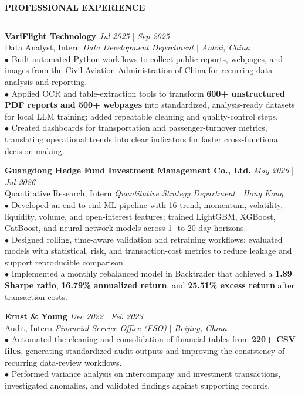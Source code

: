 \documentclass{../../../original_CV/resume}
\renewcommand{\sectionskip}{\vspace{0.10cm}}
\renewcommand{\sectionlineskip}{\vspace{0.10cm}}
\renewenvironment{rSection}[1]{
\sectionskip
\textcolor{UC San Diego Blue}{\textbf{\large\bfseries\MakeUppercase{#1}}}
\sectionlineskip
\hrule
\begin{list}{}{
\setlength{\leftmargin}{0em}
}
\item[]
}{
\end{list}
}
\begin{document}
\begin{rSection}{PROFESSIONAL EXPERIENCE}
\noindent
\textbf{VariFlight Technology} \hfill {\em Jul 2025} | {\em Sep 2025} \\
Data Analyst, Intern \hfill \textit{Data Development Department} $|$ \textit{Anhui, China} \\[4pt]
$\bullet$ Built automated Python workflows to collect public reports, webpages, and images from the Civil Aviation Administration of China for recurring data analysis and reporting.\\[1.5pt]
$\bullet$ Applied OCR and table-extraction tools to transform \textbf{600+ unstructured PDF reports and 500+ webpages} into standardized, analysis-ready datasets for local LLM training; added repeatable cleaning and quality-control steps.\\[1.5pt]
$\bullet$ Created dashboards for transportation and passenger-turnover metrics, translating operational trends into clear indicators for faster cross-functional decision-making.

\textbf{Guangdong Hedge Fund Investment Management Co., Ltd.} \hfill {\em May 2026} | {\em Jul 2026} \\
Quantitative Research, Intern \hfill \textit{Quantitative Strategy Department} $|$ \textit{Hong Kong} \\[4pt]
$\bullet$ Developed an end-to-end ML pipeline with 16 trend, momentum, volatility, liquidity, volume, and open-interest features; trained LightGBM, XGBoost, CatBoost, and neural-network models across 1- to 20-day horizons.\\[1.5pt]
$\bullet$ Designed rolling, time-aware validation and retraining workflows; evaluated models with statistical, risk, and transaction-cost metrics to reduce leakage and support reproducible comparison.\\[1.5pt]
$\bullet$ Implemented a monthly rebalanced model in Backtrader that achieved a \textbf{1.89 Sharpe ratio}, \textbf{16.79\% annualized return}, and \textbf{25.51\% excess return} after transaction costs.

\textbf{Ernst \& Young} \hfill {\em Dec 2022} | {\em Feb 2023} \\
Audit, Intern \hfill \textit{Financial Service Office (FSO)} $|$ \textit{Beijing, China} \\[4pt]
$\bullet$ Automated the cleaning and consolidation of financial tables from \textbf{220+ CSV files}, generating standardized audit outputs and improving the consistency of recurring data-review workflows.\\[1.5pt]
$\bullet$ Performed variance analysis on intercompany and investment transactions, investigated anomalies, and validated findings against supporting records.
\end{rSection}
\end{document}
